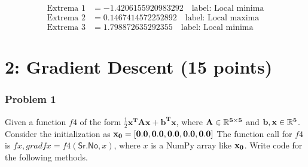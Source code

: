 \documentclass{article}
\begin{document}
\begin{align*}
    \text{Extrema 1} &= -1.4206155920983292 \quad \text{label: Local minima} \\
    \text{Extrema 2} &= 0.1467414572252892 \quad \text{label: Local maxima} \\
    \text{Extrema 3} &= 1.798872635292355 \quad \text{label: Local minima}
\end{align*}

\newpage

\part*{2: Gradient Descent (15 points)}

\section*{Problem 1}

Given a function $f4$ of the form $\frac{1}{2}\mathbf{x^T A x} + \mathbf{b^T x}$, where $\bf{A} \in \mathbb{R}^{5 \times 5}$ and $\bf{b, x} \in \mathbb{R}^5$. Consider the initialization as $\bf{x_0} = [0.0, 0.0, 0.0, 0.0, 0.0]$ The function call for $f4$ is $fx, gradfx = f4(\mathsf{Sr.No}, x)$, where $x$ is a NumPy array like $\bf{x_0}$. Write code for the following methods.
\end{document}
